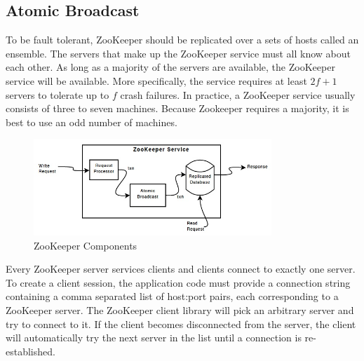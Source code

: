 \documentclass[11pt]{book}
\begin{document}
\subsection{Atomic Broadcast}
To be fault tolerant, ZooKeeper should be replicated over a sets of hosts called an ensemble. The servers that make up the ZooKeeper service must all know about each other. As long as a majority of the servers are available, the ZooKeeper service will be available. More specifically, the service requires at least $2f+1$ servers to tolerate up to $f$ crash failures. In practice, a ZooKeeper service usually consists of three to seven machines. Because Zookeeper requires a majority, it is best to use an odd number of machines.

\begin{figure}[t]
\includegraphics[width=0.8\textwidth]{images/zookeeper.jpg}
\centering
\caption{ZooKeeper Components}
\end{figure}

Every ZooKeeper server services clients and clients connect to exactly one server. To create a client session, the application code must provide a connection string containing a comma separated list of host:port pairs, each corresponding to a ZooKeeper server. The ZooKeeper client library will pick an arbitrary server and try to connect to it. If the client becomes disconnected from the server, the client will automatically try the next server in the list until a connection is re-established.
\end{document}
